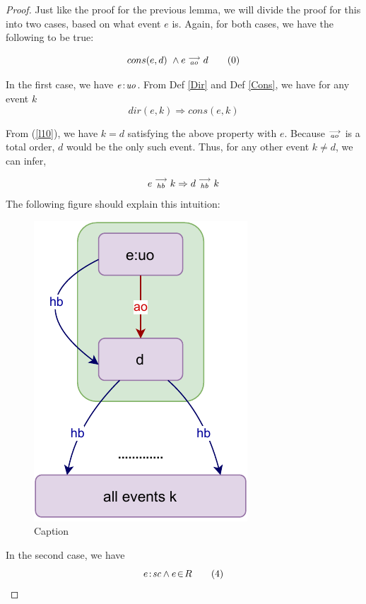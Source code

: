 \begin{proof}
    
    Just like the proof for the previous lemma, we will divide the proof for this into two cases, based on what event $e$ is. Again, for both cases, we have the following to be true:
    
    \[
        cons(e,d) \ \wedge e\stackrel{\longrightarrow}{_{ao}}d
        \tag{0}
        \label{l20}
    \]

   In the first case, we have $e\!:\!\textit{uo}$. From Def \ref{Dir} and Def \ref{Cons}, we have for any event $k$
   \[
        dir(e,k) \Rightarrow cons(e,k) 
   \]
   
   From (\ref{l10}), we have $k=d$ satisfying the above property with $e$. 
   Because $\stackrel{\longrightarrow}{_{ao}}$ is a total order, $d$ would be the only such event. 
   Thus, for any other event $k \neq d$, we can infer,
   
   \[
        e\stackrel{\longrightarrow}{_{hb}}k \Rightarrow d\stackrel{\longrightarrow}{_{hb}}k
   \]
   The following figure should explain this intuition:  
    
    \begin{figure}[H]
        \centering
        \includegraphics[scale=0.7]{InstructionReordering/Lemmas/lemma_proof2_case1.pdf}
        \caption{Caption}
        \label{fig:my_label}
    \end{figure}
    
    In the second case, we have 
    \[
        e\!:\!\textit{sc} \wedge e\!\in\!R
        \tag{4}
        \label{l24}
    \]
    

\end{proof}
